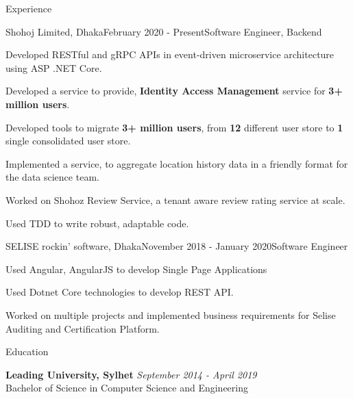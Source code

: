 \documentclass{resume}
\begin{document}
\begin{rSection}{Experience}

\begin{rSubsection}{Shohoj Limited, Dhaka}{February 2020 - Present}{Software Engineer, Backend}{}

\item Developed RESTful and gRPC APIs in event-driven microservice architecture  using  ASP .NET Core.
\item Developed a service to provide, \textbf{Identity Access Management} service for \textbf{3+ million  users}.
\item Developed tools to migrate \textbf{3+ million users}, from \textbf{12} different user store to \textbf{1} single consolidated user store.
\item Implemented a service, to aggregate location history data in a friendly format for the data science team.
\item Worked on Shohoz Review Service, a tenant aware review rating service at scale.
\item Used TDD to write robust, adaptable code.
\end{rSubsection}

\begin{rSubsection}{SELISE rockin' software, Dhaka}{November 2018 - January 2020}{Software Engineer}{}
\item Used Angular, AngularJS to develop Single Page Applications
\item Used Dotnet Core technologies to develop REST API.
\item Worked on multiple projects and implemented business requirements for Selise Auditing and Certification Platform.
\end{rSubsection}

\end{rSection}


\begin{rSection}{Education}

{\bf Leading University, Sylhet} \hfill {\em September 2014 - April 2019}
\\ Bachelor of Science in Computer Science and Engineering
\end{rSection}

\end{document}

